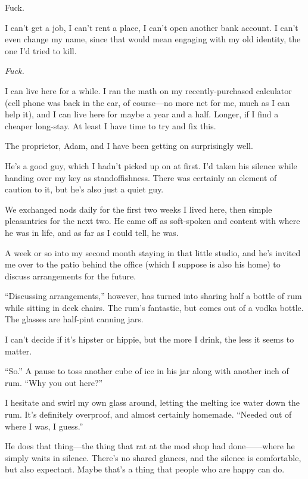 Fuck.

I can't get a job, I can't rent a place, I can't open another bank account. I can't even change my name, since that would mean engaging with my old identity, the one I'd tried to kill.

\emph{Fuck.}

I can live here for a while. I ran the math on my recently-purchased calculator (cell phone was back in the car, of course---no more net for me, much as I can help it), and I can live here for maybe a year and a half. Longer, if I find a cheaper long-stay. At least I have time to try and fix this.

\secdiv{}

\noindent The proprietor, Adam, and I have been getting on surprisingly well.

He's a good guy, which I hadn't picked up on at first. I'd taken his silence while handing over my key as standoffishness. There was certainly an element of caution to it, but he's also just a quiet guy.

We exchanged nods daily for the first two weeks I lived here, then simple pleasantries for the next two. He came off as soft-spoken and content with where he was in life, and as far as I could tell, he was.

A week or so into my second month staying in that little studio, and he's invited me over to the patio behind the office (which I suppose is also his home) to discuss arrangements for the future.

``Discussing arrangements,'' however, has turned into sharing half a bottle of rum while sitting in deck chairs. The rum's fantastic, but comes out of a vodka bottle. The glasses are half-pint canning jars.

I can't decide if it's hipster or hippie, but the more I drink, the less it seems to matter.

``So.'' A pause to toss another cube of ice in his jar along with another inch of rum. ``Why you out here?''

I hesitate and swirl my own glass around, letting the melting ice water down the rum. It's definitely overproof, and almost certainly homemade. ``Needed out of where I was, I guess.''

He does that thing---the thing that rat at the mod shop had done------where he simply waits in silence. There's no shared glances, and the silence is comfortable, but also expectant. Maybe that's a thing that people who are happy can do.

